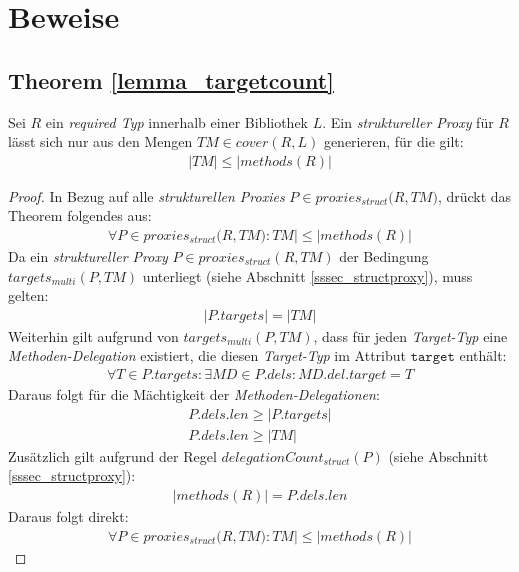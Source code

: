 \chapter{Beweise}\label{app_proofs}
\section*{Theorem \ref{lemma_targetcount}}
\begin{theorem*}
Sei $R$ ein \emph{required Typ} innerhalb einer Bibliothek $L$. 
Ein \emph{struktureller Proxy} für $R$ lässt sich nur aus den Mengen $\mathit{TM} \in \mathit{cover(R,L)}$ generieren, für die gilt:
\begin{gather*}
|\mathit{TM}| \leq |\mathit{methods(R)}|
\end{gather*}
\end{theorem*}
\begin{proof}
In Bezug auf alle \emph{strukturellen Proxies} $P \in \mathit{proxies_{struct}(R,TM})$, drückt das Theorem folgendes aus:
\begin{gather*}
\forall \mathit{P} \in \mathit{proxies_{struct}(R,TM}):\mathit{TM}| \leq |\mathit{methods(R)}|
\end{gather*}
\noindent
Da ein \emph{struktureller Proxy} $P \in \mathit{proxies_{struct}(R,TM)}$ der Bedingung $\mathit{targets_{multi}(P,TM)}$ unterliegt (siehe Abschnitt \ref{sssec_structproxy}), muss gelten:
\begin{gather*}
|\mathit{P.targets}| = |\mathit{TM}|
\end{gather*}
Weiterhin gilt aufgrund von $\mathit{targets_{multi}(P,TM)}$, dass für jeden \emph{Target-Typ} eine \emph{Methoden-Delegation} existiert, die diesen \emph{Target-Typ} im Attribut $\texttt{target}$ enthält:
\begin{gather*}
\forall \mathit{T} \in \mathit{P.targets}: \exists \mathit{MD} \in \mathit{P.dels}:\mathit{MD.del.target} = T
\end{gather*}
Daraus folgt für die Mächtigkeit der \emph{Methoden-Delegationen}:
\begin{gather*}
\mathit{P.dels.len} \geq |\mathit{P.targets}|\\ \mathit{P.dels.len} \geq |\mathit{TM}|
\end{gather*}
\noindent
Zusätzlich gilt aufgrund der Regel $\mathit{delegationCount_{struct}(P)}$ (siehe Abschnitt \ref{sssec_structproxy}):
\begin{gather*}
|\mathit{methods(R)}| = \mathit{P.dels.len}
\end{gather*}
Daraus folgt direkt:
\begin{gather*}
\forall \mathit{P} \in \mathit{proxies_{struct}(R,TM}):\mathit{TM}| \leq |\mathit{methods(R)}|
\end{gather*}
\end{proof}

